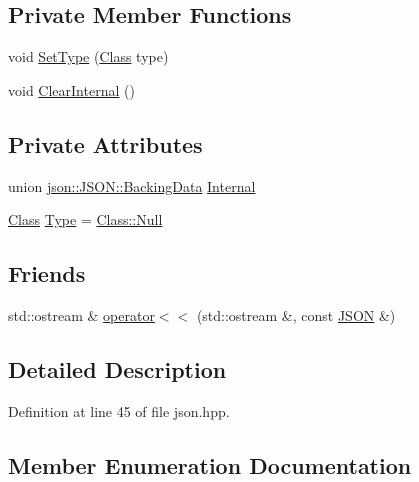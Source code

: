 \subsection*{Private Member Functions}
\begin{DoxyCompactItemize}
\item 
void \mbox{\hyperlink{classjson_1_1_j_s_o_n_a668500208950e48394fc8bfe7c320205}{Set\+Type}} (\mbox{\hyperlink{classjson_1_1_j_s_o_n_a762f55df6d407c1af61607ed516ffe07}{Class}} type)
\item 
void \mbox{\hyperlink{classjson_1_1_j_s_o_n_afefdc8c18c2c40575c2c8463fbd78c67}{Clear\+Internal}} ()
\end{DoxyCompactItemize}
\subsection*{Private Attributes}
\begin{DoxyCompactItemize}
\item 
union \mbox{\hyperlink{unionjson_1_1_j_s_o_n_1_1_backing_data}{json\+::\+J\+S\+O\+N\+::\+Backing\+Data}} \mbox{\hyperlink{classjson_1_1_j_s_o_n_a1e2a064794c3d55c8bb8887fc5734947}{Internal}}
\item 
\mbox{\hyperlink{classjson_1_1_j_s_o_n_a762f55df6d407c1af61607ed516ffe07}{Class}} \mbox{\hyperlink{classjson_1_1_j_s_o_n_a3fa6923afa41bdfe38077fbc0079aaf5}{Type}} = \mbox{\hyperlink{classjson_1_1_j_s_o_n_a762f55df6d407c1af61607ed516ffe07abbb93ef26e3c101ff11cdd21cab08a94}{Class\+::\+Null}}
\end{DoxyCompactItemize}
\subsection*{Friends}
\begin{DoxyCompactItemize}
\item 
std\+::ostream \& \mbox{\hyperlink{classjson_1_1_j_s_o_n_a5513ab67f2660e88d73c75fc83b6945c}{operator$<$$<$}} (std\+::ostream \&, const \mbox{\hyperlink{classjson_1_1_j_s_o_n}{J\+S\+ON}} \&)
\end{DoxyCompactItemize}


\subsection{Detailed Description}


Definition at line 45 of file json.\+hpp.



\subsection{Member Enumeration Documentation}
\mbox{\label{classjson_1_1_j_s_o_n_a762f55df6d407c1af61607ed516ffe07}} 
